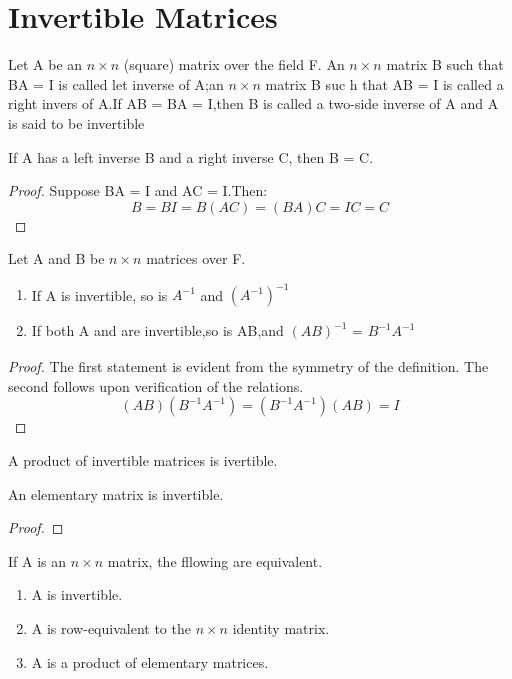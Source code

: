 \section{Invertible Matrices}

\begin{definition}
	Let A be an $n \times n$ (square) matrix over the field F. An $n \times n$ matrix B such that BA = I is called let inverse of A;an $n \times n$ matrix B suc h that AB = I is called a right invers of A.If AB = BA = I,then B is called a two-side inverse of A and A is said to be invertible
\end{definition}

\begin{lemma}
	If A has a left inverse B and a right inverse C, then B = C.
	\begin{proof}
		Suppose BA = I and AC = I.Then: \[
			B = BI = B(AC) = (BA)C = IC = C
		\]
	\end{proof}
\end{lemma}

\begin{theorem}
	Let A and B be $n \times n$ matrices over F.
	\begin{enumerate}
		\item If A is invertible, so is $A_{}^{-1}$ and $(A_{}^{-1})^{-1}$
		\item If both A and  are invertible,so is AB,and $(AB)_{}^{-1}$ = $B_{}^{-1}A_{}^{-1}$

	\end{enumerate}
	\begin{proof}
		The first statement is evident from the symmetry of the definition. The second follows upon verification of the relations.
		\[
			(AB)(B_{}^{-1}A_{}^{-1}) = (B_{}^{-1}A_{}^{-1})(AB) = I
		\]
	\end{proof}
\end{theorem}


\begin{corollary}
	A product of invertible matrices is ivertible.
\end{corollary}

\begin{theorem}
	An elementary matrix is invertible.
\end{theorem}

\begin{proof}

\end{proof}


\begin{theorem}
	If A is an $n \times n$ matrix, the fllowing are equivalent.
	\begin{enumerate}
		\item A is invertible.
		\item A is row-equivalent to the $n \times n$ identity matrix.
		\item A is a product of elementary matrices.
	\end{enumerate}
\end{theorem}

